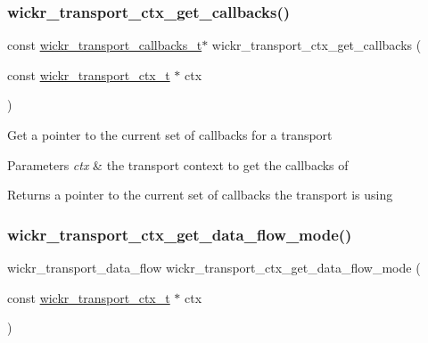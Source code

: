 \subsubsection{\texorpdfstring{wickr\+\_\+transport\+\_\+ctx\+\_\+get\+\_\+callbacks()}{wickr\_transport\_ctx\_get\_callbacks()}}
{\footnotesize\ttfamily const \mbox{\hyperlink{structwickr__transport__callbacks}{wickr\+\_\+transport\+\_\+callbacks\+\_\+t}}$\ast$ wickr\+\_\+transport\+\_\+ctx\+\_\+get\+\_\+callbacks (\begin{DoxyParamCaption}\item[{const \mbox{\hyperlink{structwickr__transport__ctx}{wickr\+\_\+transport\+\_\+ctx\+\_\+t}} $\ast$}]{ctx }\end{DoxyParamCaption})}

Get a pointer to the current set of callbacks for a transport


\begin{DoxyParams}{Parameters}
{\em ctx} & the transport context to get the callbacks of \\
\hline
\end{DoxyParams}
\begin{DoxyReturn}{Returns}
a pointer to the current set of callbacks the transport is using 
\end{DoxyReturn}
\mbox{\label{group__wickr__transport__ctx_gaffad367319e17f62046cde388ccd8802}} 
\subsubsection{\texorpdfstring{wickr\+\_\+transport\+\_\+ctx\+\_\+get\+\_\+data\+\_\+flow\+\_\+mode()}{wickr\_transport\_ctx\_get\_data\_flow\_mode()}}
{\footnotesize\ttfamily wickr\+\_\+transport\+\_\+data\+\_\+flow wickr\+\_\+transport\+\_\+ctx\+\_\+get\+\_\+data\+\_\+flow\+\_\+mode (\begin{DoxyParamCaption}\item[{const \mbox{\hyperlink{structwickr__transport__ctx}{wickr\+\_\+transport\+\_\+ctx\+\_\+t}} $\ast$}]{ctx }\end{DoxyParamCaption})}

